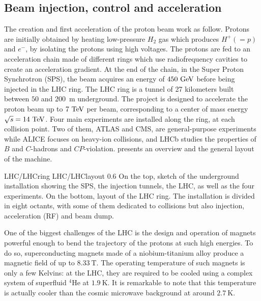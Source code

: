     \subsection{Beam injection, control and acceleration}

    The creation and first acceleration of the proton beam work as follow.
    Protons are initially obtained by heating low-pressure $H_2$ gas which
    produces $H^+ (= p)$ and $e^-$, by isolating the protons using high
    voltages. The protons are fed to an acceleration chain made of different
    rings which use radiofrequency cavities to create an acceleration gradient.
    At the end of the chain, in the Super Proton Synchrotron (SPS), the beam
    acquires an energy of $450~\text{GeV}$ before being injected in the LHC ring. The
    LHC ring is a tunnel of 27 kilometers built between $50$ and $200$~m
    underground. The project is designed to accelerate the proton beam up to
    $7~\text{TeV}$ per beam, corresponding to a center of mass energy $\sqrt{s} =
    14~\text{TeV}$. Four main experiments are installed along the ring, at each
    collision point. Two of them, ATLAS and CMS, are general-purpose experiments
    while ALICE focuses on heavy-ion collisions, and LHCb studies the properties
    of $B$ and $C$-hadrons and $CP$-violation.  presents
    an overview and the general layout of the machine.

                     {LHC/LHCring}
                     {LHC/LHClayout}
                     {0.6}
                     {On the top, sketch of the underground installation showing
                     the SPS, the injection tunnels, the LHC, as well as the
                     four experiments. On the bottom, layout of the LHC ring.
                     The installation is divided in eight octants, with some of
                     them dedicated to collisions but also injection,
                     acceleration (RF) and beam dump.}

    One of the biggest challenges of the LHC is the design and operation of
    magnets powerful enough to bend the trajectory of the protons at such high
    energies. To do so, superconducting magnets made of a niobium-titanium alloy
    produce a magnetic field of up to $8.33~\text{T}$. The operating temperature
    of such magnets is only a few Kelvins: at the LHC, they are required to be
    cooled using a complex system of superfluid $^4$He at $1.9~\text{K}$. It is
    remarkable to note that this temperature is actually cooler than the cosmic
    microwave background at around $2.7~\text{K}$.

